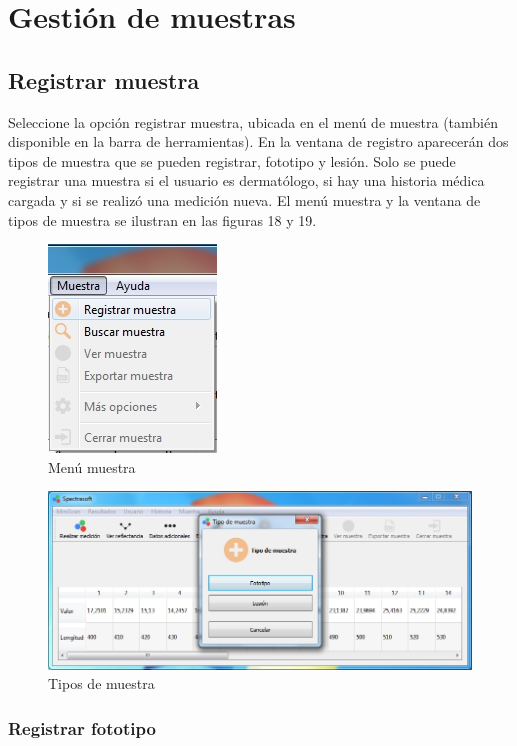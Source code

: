 \newpage

\section{Gesti\'{o}n de muestras}

	\subsection{Registrar muestra}
	
	Seleccione la opci\'{o}n registrar muestra, ubicada en el men\'{u} de muestra (tambi\'{e}n disponible en la barra de herramientas). En la ventana de registro aparecer\'{a}n dos tipos de muestra que se pueden registrar, fototipo y lesi\'{o}n. Solo se puede registrar una muestra si el usuario es dermat\'{o}logo, si hay una historia m\'{e}dica cargada y si se realiz\'{o} una medici\'{o}n nueva. El men\'{u} muestra y la ventana de tipos de muestra se ilustran en las figuras 18 y 19.
	
\begin{figure}[H]
  \centering
  \includegraphics[width=.3\linewidth]{./img/menu-muestra.jpg}
\caption{Men\'{u} muestra}
\end{figure}

\begin{figure}[H]
  \centering
  \includegraphics[width=.9\linewidth]{./img/tipo-muestra.jpg}
\caption{Tipos de muestra}
\end{figure}
	
		\subsubsection{Registrar fototipo}
		
